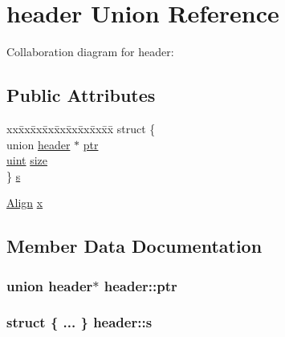 \hypertarget{unionheader}{}\section{header Union Reference}
\label{unionheader}


Collaboration diagram for header\+:
\subsection*{Public Attributes}
\begin{DoxyCompactItemize}
\item 
\begin{tabbing}
xx\=xx\=xx\=xx\=xx\=xx\=xx\=xx\=xx\=\kill
struct \{\\
\>union \hyperlink{unionheader}{header} $\ast$ \hyperlink{unionheader_adcb7a02e18836885c802789f6a6c99fd}{ptr}\\
\>\hyperlink{custom__types_8h_a91ad9478d81a7aaf2593e8d9c3d06a14}{uint} \hyperlink{unionheader_a70db454b20b4a40995532b7ea029a527}{size}\\
\} \hyperlink{unionheader_a3d684c1d6a9465b92eb26550d38ce659}{s}\\

\end{tabbing}\item 
\hyperlink{umalloc_8c_aa508dd61e627680e57643837d292d89f}{Align} \hyperlink{unionheader_a2f321dbb657408f93d0c585f55951bdb}{x}
\end{DoxyCompactItemize}


\subsection{Member Data Documentation}
\subsubsection[{\texorpdfstring{ptr}{ptr}}]{\setlength{\rightskip}{0pt plus 5cm}union {\bf header}$\ast$ header\+::ptr}\hypertarget{unionheader_adcb7a02e18836885c802789f6a6c99fd}{}\label{unionheader_adcb7a02e18836885c802789f6a6c99fd}
\subsubsection[{\texorpdfstring{s}{s}}]{\setlength{\rightskip}{0pt plus 5cm}struct \{ ... \}   header\+::s}\hypertarget{unionheader_a3d684c1d6a9465b92eb26550d38ce659}{}\label{unionheader_a3d684c1d6a9465b92eb26550d38ce659}
